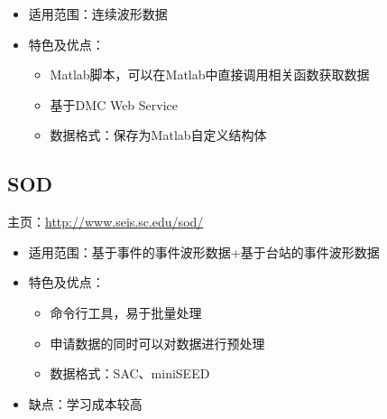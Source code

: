 \begin{itemize}
\item 适用范围：连续波形数据
\item 特色及优点：
    \begin{itemize}
    \item Matlab脚本，可以在Matlab中直接调用相关函数获取数据
    \item 基于DMC Web Service
    \item 数据格式：保存为Matlab自定义结构体
    \end{itemize}
\end{itemize}

\subsection{SOD}
主页：\url{http://www.seis.sc.edu/sod/}

\begin{itemize}
\item 适用范围：基于事件的事件波形数据+基于台站的事件波形数据
\item 特色及优点：
    \begin{itemize}
    \item 命令行工具，易于批量处理
    \item 申请数据的同时可以对数据进行预处理
    \item 数据格式：SAC、miniSEED
    \end{itemize}
\item 缺点：学习成本较高
\end{itemize}

